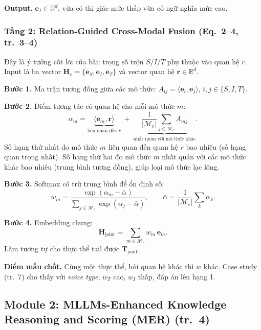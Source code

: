 \documentclass[11pt,a4paper]{article}
\newcommand{\Hj}{\mathbf{H}_{\mathrm{joint}}}
\newcommand{\Tj}{\mathbf{T}_{\mathrm{joint}}}
\newcommand{\Ent}[1]{\textit{#1}}
\begin{document}
\textbf{Output.} $\mathbf{e}_I \in \mathbb{R}^d$, vừa có thị giác mức thấp vừa có ngữ nghĩa mức cao.

\subsubsection{Tầng 2: Relation-Guided Cross-Modal Fusion (Eq.~2--4, tr.~3--4)}

Đây là ý tưởng cốt lõi của bài: trọng số trộn $S/I/T$ phụ thuộc vào quan hệ $r$. Input là ba vector $\mathbf{H}_e = \{\mathbf{e}_S, \mathbf{e}_I, \mathbf{e}_T\}$ và vector quan hệ $\mathbf{r} \in \mathbb{R}^d$.

\textbf{Bước 1.} Ma trận tương đồng giữa các mô thức: $A_{ij} = \langle \mathbf{e}_i, \mathbf{e}_j\rangle$, $i, j \in \{S, I, T\}$.

\textbf{Bước 2.} Điểm tương tác có quan hệ cho mỗi mô thức $m$:
\begin{equation}
\alpha_m = \underbrace{\langle \mathbf{e}_m, \mathbf{r}\rangle}_{\text{liên quan đến } r} \;+\; \underbrace{\frac{1}{|\mathcal{M}_e|}\sum_{j \in \mathcal{M}_e} A_{mj}}_{\text{nhất quán với mô thức khác}}.
\label{eq:alpha}
\end{equation}
Số hạng thứ nhất đo mô thức $m$ liên quan đến quan hệ $r$ bao nhiêu (số hạng quan trọng nhất). Số hạng thứ hai đo mô thức $m$ nhất quán với các mô thức khác bao nhiêu (trung bình tương đồng), giúp loại mô thức lạc lõng.

\textbf{Bước 3.} Softmax có trừ trung bình để ổn định số:
\begin{equation}
w_m = \frac{\exp(\alpha_m - \bar{\alpha})}{\sum_{j \in \mathcal{M}_e}\exp(\alpha_j - \bar{\alpha})}, \qquad \bar{\alpha} = \frac{1}{|\mathcal{M}_e|}\sum_{k}\alpha_k.
\label{eq:w}
\end{equation}

\textbf{Bước 4.} Embedding chung:
\begin{equation}
\Hj = \sum_{m \in \mathcal{M}_e} w_m\,\mathbf{e}_m.
\label{eq:joint}
\end{equation}
Làm tương tự cho thực thể tail được $\Tj$.

\textbf{Điểm mấu chốt.} Cùng một thực thể, hỏi quan hệ khác thì $w$ khác. Case study (tr.~7) cho thấy với \Ent{voice type}, $w_T$ cao, $w_I$ thấp, đáp án lên hạng 1.

\subsection{Module 2: MLLMs-Enhanced Knowledge Reasoning and Scoring (MER) (tr.~4)}
\end{document}
